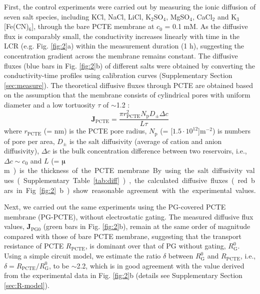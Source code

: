\documentclass[journal=langd5,email=true, hyperref=true, keywords=false]{achemso}
\begin{document}
First, the control experiments were carried out by measuring the ionic
diffusion of seven salt species, including KCl, NaCl, LiCl,
K$_{2}$SO$_{4}$, MgSO$_{4}$, CaCl$_{2}$ and K$_{3}$[Fe(CN)$_{6}$],
through the bare PCTE membrane at $c_{0}$ = 0.1 mM. As the diffusive
flux is comparably small, the conductivity increases linearly with
time in the LCR (e.g. Fig. \ref{fig:2}a) within the measurement
duration (1 h), suggesting the concentration gradient across the
membrane remains constant. The diffusive fluxes (blue bars in Fig.
\ref{fig:2}b) of different salts were obtained by converting the
conductivity-time profiles using calibration curves (Supplementary
Section \ref{sec:measure}). The theoretical diffusive fluxes
through PCTE are obtained based on the assumption that the membrane
consists of cylindrical pores with uniform diameter and a low
tortuosity $\tau$ of $\sim{}$1.2 \cite{O_Hern_2012}:
\begin{equation}
  \label{eq:j-pcte}
  \boldsymbol{J}_{\mathrm{PCTE}} = \frac{\pi r_{\mathrm{PCTE}}^{2} N_{\mathrm{p}} D_{\mathrm{\pm}} \Delta c}{L \tau}
\end{equation}
{where $r_{\mathrm{PCTE}}$ (= \unit[200]{nm}) is the PCTE pore radius, $N_{\mathrm{p}}$  (= \unit[$1.5\cdot10^{12}$]{m$^{-2}$}) is
numbers of pore per area, $D_{\mathrm{\pm}}$ is the salt diffusivity
(average of cation and anion diffusivity), $\Delta c$ is the bulk
concentration difference between two reservoirs, i.e.,
$\Delta c \sim c_{0}$ and $L$ (= \unit[24]{$\muup$m}) is the thickness of the PCTE membrane.
By using the salt diffusivity values (Supplementary Table
\ref{tab:diff}), the calculated diffusive fluxes (red bars in
Fig. \ref{fig:2}b) show reasonable agreement with the experimental
values.}

Next, we carried out the same experiments using the PG-covered PCTE
membrane (PG-PCTE), without electrostatic gating. The measured
diffusive flux values, $\boldsymbol{J}_{\mathrm{PG0}}$ (green bars in
Fig. \ref{fig:2}b), remain at the same order of magnitude compared
with those of bare PCTE membrane, suggesting that the transport
resistance of PCTE $R_{\mathrm{PCTE}}$, is dominant over that of PG
without gating, $R_{\mathrm{G}}^{0}$. Using a simple circuit model, we
estimate the ratio $\delta$ between $R_{\mathrm{G}}^{0}$ and
$R_{\mathrm{PCTE}}$, i.e.,
$\delta = R_{\mathrm{PCTE}}/R_{\mathrm{G}}^{0}$, to be $\sim$2.2,
which is in good agreement with the value derived from the
experimental data in Fig. \ref{fig:2}b (details see Supplementary
Section \ref{sec:R-model}).
\end{document}
